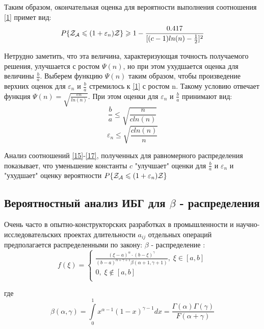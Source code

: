 \documentclass[a4paper, 14pt]{extarticle}
\numberwithin{equation}{section}
\begin{document}
Таким образом, окончательная оценка для вероятности выполнения соотношения \eqref{1} примет вид:
\begin{equation}\label{15}
P \{ \text{$\mathcal{Z_{A}}$} \leqslant (1+\varepsilon_n)\mathcal{Z} \} \geqslant 1 - \frac{0.417}{[(c-1)ln(n)-\frac{1}{2}]^2}
\end{equation}

Нетрудно заметить, что эта величина, характеризующая точность получаемого решения, улучшается с ростом $\Psi(n)$, но при этом ухудшается оценка для величины $\frac{b}{a}$. Выберем функцию $\Psi(n)$ таким образом, чтобы произведение верхних оценок для $\varepsilon_n$ и $\frac{b}{a}$ стремилось к \eqref{1} с ростом n. Такому условию отвечает функция $\Psi(n) = \sqrt{\frac{cn}{ln(n)}}$. При этом оценки для $\varepsilon_n$ и $\frac{b}{a}$ принимают вид:
\begin{equation}\label{16}
\frac{b}{a} \leqslant \sqrt{\frac{n}{cln(n)}}
\end{equation}
\begin{equation}\label{17}
\varepsilon_n \leqslant \sqrt{\frac{cln(n)}{n}}
\end{equation}

Анализ соотношений \ref{15}-\ref{17}, полученных для равномерного распределения показывает, что уменьшение константы $c$ "улучшает" оценки для $\frac{b}{a}$ и $\varepsilon_n$ и "ухудшает" оценку вероятности $P \{ \text{$\mathcal{Z_{A}}$} \leqslant (1+\varepsilon_n)\mathcal{Z} \}$\\


\subsection{Вероятностный анализ ИБГ для $\beta$ - распределения}


 Очень часто в опытно-конструкторских разработках в промышленности и научно-исследовательских проектах длительности $a_{ij}$ отдельных операций предполагается распределенными по закону: $\beta$ - распределение :
\begin{equation}
f(\xi) = 
\begin{cases}
   \frac{(\xi-a)^\alpha \cdot (b-\xi)^\gamma}{(b-a)^{\alpha+\gamma+1} \beta(\alpha+1, \gamma+1)},  \; \xi \in [a,b]\\
   0, \; \xi \notin [a,b] \\
 \end{cases}
\end{equation}

где
\begin{equation}
\beta(\alpha, \gamma) = \int\limits_0^1 x^{\alpha-1} (1-x)^{\gamma-1} dx = \frac{\Gamma(\alpha)\Gamma(\gamma)}{F(\alpha+\gamma)}
\end{equation}
\end{document}
